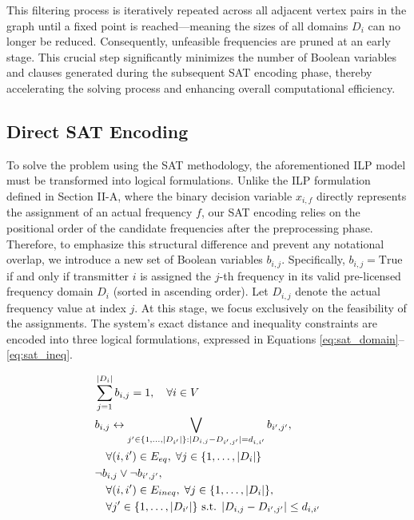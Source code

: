 \documentclass[letterpaper,journal]{IEEEtran}
\begin{document}
This filtering process is iteratively repeated across all adjacent vertex pairs in the graph until a fixed point is reached—meaning the sizes of all domains $D_i$ can no longer be reduced. Consequently, unfeasible frequencies are pruned at an early stage. This crucial step significantly minimizes the number of Boolean variables and clauses generated during the subsequent SAT encoding phase, thereby accelerating the solving process and enhancing overall computational efficiency.

\subsection{Direct SAT Encoding}
\label{subsec:sat_encoding}

To solve the problem using the SAT methodology, the aforementioned ILP model must be transformed into logical formulations. Unlike the ILP formulation defined in Section II-A, where the binary decision variable $x_{i,f}$ directly represents the assignment of an actual frequency $f$, our SAT encoding relies on the positional order of the candidate frequencies after the preprocessing phase. Therefore, to emphasize this structural difference and prevent any notational overlap, we introduce a new set of Boolean variables $b_{i,j}$. Specifically, $b_{i,j} = \text{True}$ if and only if transmitter $i$ is assigned the $j$-th frequency in its valid pre-licensed frequency domain $D_i$ (sorted in ascending order). Let $D_{i,j}$ denote the actual frequency value at index $j$. At this stage, we focus exclusively on the feasibility of the assignments. The system's exact distance and inequality constraints are encoded into three logical formulations, expressed in Equations \eqref{eq:sat_domain}--\eqref{eq:sat_ineq}.

\begin{align}
    & \sum_{j=1}^{|D_i|} b_{i,j} = 1, \quad \forall i \in V \label{eq:sat_domain} \\
    & b_{i,j} \leftrightarrow \bigvee_{j' \in \{1, \dots, |D_{i'}|\} : |D_{i,j} - D_{i',j'}| = d_{i,i'}} b_{i',j'}, \notag \\
    & \quad \forall (i,i') \in E_{eq}, \; \forall j \in \{1, \dots, |D_i|\} \label{eq:sat_exact} \\
    & \neg b_{i,j} \vee \neg b_{i',j'}, \notag \\
    & \quad \forall (i,i') \in E_{ineq}, \; \forall j \in \{1, \dots, |D_i|\}, \notag \\
    & \quad \forall j' \in \{1, \dots, |D_{i'}|\} \text{ s.t. } |D_{i,j} - D_{i',j'}| \le d_{i,i'} \label{eq:sat_ineq}
\end{align}
\end{document}
